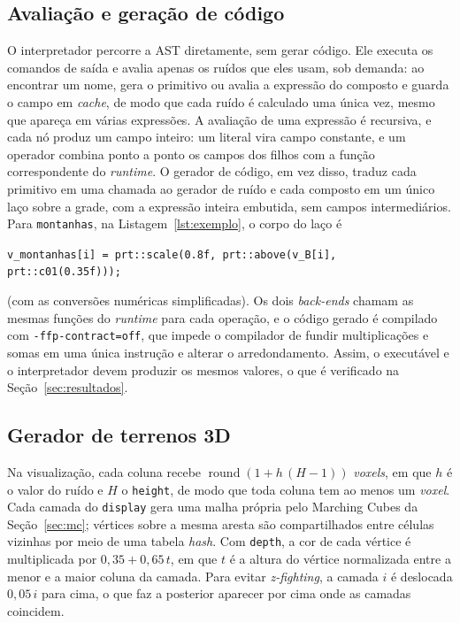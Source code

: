\documentclass[sigconf, nonacm, screen, language=portuguese, language={main=english}]{acmart}
\begin{document}
\subsection{Avaliação e geração de código}\label{sec:avaliacao}
O interpretador percorre a AST diretamente, sem gerar código. Ele
executa os comandos de saída e avalia apenas os ruídos que eles usam,
sob demanda: ao encontrar um nome, gera o primitivo ou avalia a
expressão do composto e guarda o campo em \textit{cache}, de modo que
cada ruído é calculado uma única vez, mesmo que apareça em várias
expressões. A avaliação de uma expressão é recursiva, e cada nó produz
um campo inteiro: um literal vira campo constante, e um operador combina
ponto a ponto os campos dos filhos com a função correspondente do
\textit{runtime}. O gerador de
código, em vez disso, traduz cada primitivo em uma chamada ao gerador
de ruído e cada composto em um único laço sobre a grade, com a
expressão inteira embutida, sem campos intermediários. Para
\texttt{montanhas}, na Listagem~\ref{lst:exemplo}, o corpo do laço é
\begin{center}
\scriptsize
\texttt{v\_montanhas[i] = prt::scale(0.8f, prt::above(v\_B[i], prt::c01(0.35f)));}
\end{center}
(com as conversões numéricas simplificadas). Os dois \textit{back-ends}
chamam as mesmas funções do \textit{runtime} para cada operação, e o
código gerado é compilado com \texttt{-ffp-contract=off}, que impede o
compilador de fundir multiplicações e somas em uma única instrução e
alterar o arredondamento. Assim, o executável e o interpretador devem
produzir os mesmos valores, o que é verificado na
Seção~\ref{sec:resultados}.

\subsection{Gerador de terrenos 3D}\label{sec:gerador}
Na visualização, cada coluna recebe
$\operatorname{round}(1 + h\,(H-1))$ \textit{voxels}, em que $h$ é o
valor do ruído e $H$ o \texttt{height}, de modo que toda coluna tem ao
menos um \textit{voxel}. Cada camada do \texttt{display} gera uma malha
própria pelo Marching Cubes da Seção~\ref{sec:mc}; vértices sobre a
mesma aresta são compartilhados entre células vizinhas por meio de uma
tabela \textit{hash}. Com \texttt{depth}, a cor de cada vértice é
multiplicada por $0{,}35 + 0{,}65\,t$, em que $t$ é a altura do vértice
normalizada entre a menor e a maior coluna da camada. Para evitar
\textit{z-fighting}, a camada $i$ é deslocada $0{,}05\,i$ para cima, o
que faz a posterior aparecer por cima onde as camadas coincidem.
\end{document}
